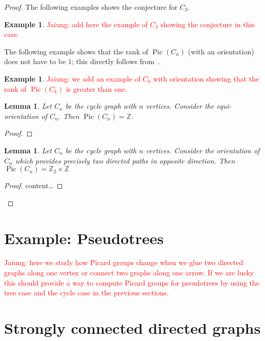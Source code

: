 \documentclass[11pt,reqno]{amsart}
\DeclareMathOperator{\Pic}{Pic}
\theoremstyle{definition}
\newtheorem{myeg}[mydef]{\textbf{Example}}
\theoremstyle{plain}
\newtheorem{lem}[mydef]{\textbf{Lemma}}
\begin{document}
\begin{proof}
		The following examples shows the conjecture for $C_3$.

		\begin{myeg}
			\textcolor{red}{Jaiung: add here the example of $C_3$ showing the conjecture in this case.}
		\end{myeg}

		The following example shows that the rank of $\Pic(C_n)$ (with an orientation) does not have to be $1$;
		this directly follows from~\cite[Corollary 3.5]{wagner2000critical}.

		\begin{myeg}
			\textcolor{red}{Jaiung: we add an example of $C_k$ with orientation showing that the rank of
			$\Pic(C_k)$ is greater than one. }
		\end{myeg}

		\begin{lem}
			Let $C_n$ be the cycle graph with $n$ vertices. Consider the equi-orientation of $C_n$.
			Then $\Pic(C_n)=\mathbb{Z}$.
		\end{lem}
		\begin{proof}

		\end{proof}

		\begin{lem}
			Let $C_n$ be the cycle graph with $n$ vertices. Consider the orientation of $C_n$ which provides precisely
			two directed paths in opposite direction. Then $\Pic(C_n)=\mathbb{Z}_2 \times \mathbb{Z}$
		\end{lem}
		\begin{proof}
			content\ldots
		\end{proof}
	\end{proof}

\section{Example: Pseudotrees}

	\textcolor{red}{Jaiung: here we study how Picard groups change when we glue two directed graphs along one vertex or
		connect two graphs along one arrow. If we are lucky this should provide a way to compute Picard groups for
		pseudotrees by using the tree case and the cycle case in the previous sections.}

\section{Strongly connected directed graphs}



\end{document}
